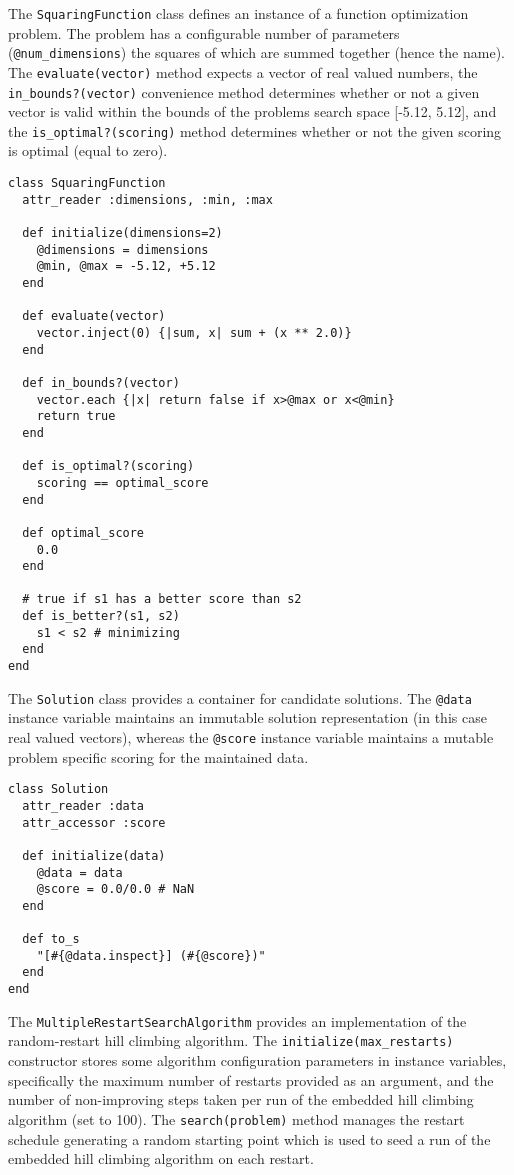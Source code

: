 The \texttt{SquaringFunction} class defines an instance of a function optimization problem. The problem has a configurable number of parameters (\texttt{@num\_dimensions}) the squares of which are summed together (hence the name). The \texttt{evaluate(vector)} method expects a vector of real valued numbers, the \texttt{in\_bounds?(vector)} convenience method determines whether or not a given vector is valid within the bounds of the problems search space [-5.12, 5.12], and the \texttt{is\_optimal?(scoring)} method determines whether or not the given scoring is optimal (equal to zero).

\begin{lstlisting}
class SquaringFunction
  attr_reader :dimensions, :min, :max

  def initialize(dimensions=2)
    @dimensions = dimensions
    @min, @max = -5.12, +5.12
  end

  def evaluate(vector)
    vector.inject(0) {|sum, x| sum + (x ** 2.0)}
  end  
  
  def in_bounds?(vector)
    vector.each {|x| return false if x>@max or x<@min}
    return true    
  end

  def is_optimal?(scoring)
    scoring == optimal_score
  end

  def optimal_score
    0.0
  end
  
  # true if s1 has a better score than s2
  def is_better?(s1, s2)
    s1 < s2 # minimizing
  end
end
\end{lstlisting}

The \texttt{Solution} class provides a container for candidate solutions. The \texttt{@data} instance variable maintains an immutable solution representation (in this case real valued vectors), whereas the \texttt{@score} instance variable maintains a mutable problem specific scoring for the maintained data. 

\begin{lstlisting}
class Solution
  attr_reader :data
  attr_accessor :score
  
  def initialize(data)
    @data = data
    @score = 0.0/0.0 # NaN
  end
  
  def to_s
    "[#{@data.inspect}] (#{@score})"
  end    
end
\end{lstlisting}

The \texttt{MultipleRestartSearchAlgorithm} provides an implementation of the random-restart hill climbing algorithm. The \texttt{initialize(max\_restarts)} constructor stores some algorithm configuration parameters in instance variables, specifically the maximum number of restarts provided as an argument, and the number of non-improving steps taken per run of the embedded hill climbing algorithm (set to 100). The \texttt{search(problem)} method manages the restart schedule generating a random starting point which is used to seed a run of the embedded hill climbing algorithm on each restart.

